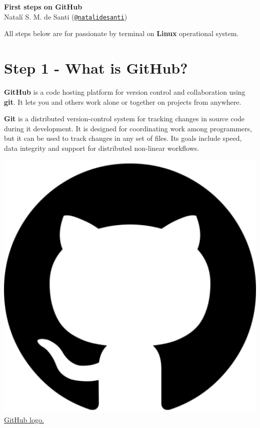 \documentclass[12pt,a4paper,titlepage,brazil]{article}
\begin{document}
\begin{center}
 \huge{\textbf{First steps on GitHub}}\\
 \large{Natalí S. M. de Santi (\href{https://github.com/natalidesanti}{\texttt{@natalidesanti}})}
\end{center}

All steps below are for passionate by terminal on {\bf Linux} operational system.


\section{Step 1 - What is GitHub?}

\begin{minipage}{0.7\textwidth}
{\bf GitHub} is a code hosting platform for version control and collaboration using {\bf git}. It lets you and others work alone or together on projects from anywhere.

{\bf Git} is a distributed version-control system for tracking changes in source code during it development. It is designed for coordinating work among programmers, but it can be used to track changes in any set of files. Its goals include speed, data integrity and support for distributed non-linear workflows.\\
\end{minipage}
\begin{minipage}{0.3\textwidth}
 \vspace{-0.5cm}
 \centering    
 \includegraphics[scale=0.22]{github-logo.png}\\
\href{https://www.flaticon.com/authors/dave-gandy}{GitHub logo.}
\end{minipage}
\end{document}
